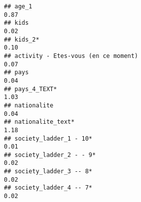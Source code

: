 \documentclass[
]{article}
\begin{document}
\begin{verbatim}
## age_1                                                                                                                                                                                                                        0.87
## kids                                                                                                                                                                                                                         0.02
## kids_2*                                                                                                                                                                                                                      0.10
## activity - Etes-vous (en ce moment)                                                                                                                                                                                          0.07
## pays                                                                                                                                                                                                                         0.04
## pays_4_TEXT*                                                                                                                                                                                                                 1.03
## nationalite                                                                                                                                                                                                                  0.04
## nationalite_text*                                                                                                                                                                                                            1.18
## society_ladder_1 - 10*                                                                                                                                                                                                       0.01
## society_ladder_2 - - 9*                                                                                                                                                                                                      0.02
## society_ladder_3 -- 8*                                                                                                                                                                                                       0.02
## society_ladder_4 -- 7*                                                                                                                                                                                                       0.02

\end{verbatim}
\end{document}
